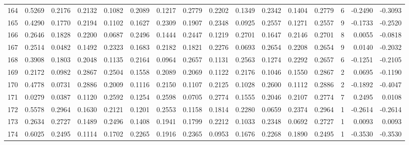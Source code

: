\begin{tabular}{lrrrrrrrrrrrrrrr}
164 &      0.5269 &  0.2176 &  0.2132 &  0.1082 &  0.2089 &  0.1217 &  0.2779 &  0.2202 &  0.1349 &  0.2342 &   0.1404 &     0.2779 &      6 &                   -0.2490 &                    -0.3093 \\
165 &      0.4290 &  0.1770 &  0.2194 &  0.1102 &  0.1627 &  0.2309 &  0.1907 &  0.2348 &  0.0925 &  0.2557 &   0.1271 &     0.2557 &      9 &                   -0.1733 &                    -0.2520 \\
166 &      0.2646 &  0.1828 &  0.2200 &  0.0687 &  0.2496 &  0.1444 &  0.2447 &  0.1219 &  0.2701 &  0.1647 &   0.2146 &     0.2701 &      8 &                    0.0055 &                    -0.0818 \\
167 &      0.2514 &  0.0482 &  0.1492 &  0.2323 &  0.1683 &  0.2182 &  0.1821 &  0.2276 &  0.0693 &  0.2654 &   0.2208 &     0.2654 &      9 &                    0.0140 &                    -0.2032 \\
168 &      0.3908 &  0.1803 &  0.2048 &  0.1135 &  0.2164 &  0.0964 &  0.2657 &  0.1131 &  0.2563 &  0.1274 &   0.2292 &     0.2657 &      6 &                   -0.1251 &                    -0.2105 \\
169 &      0.2172 &  0.0982 &  0.2867 &  0.2504 &  0.1558 &  0.2089 &  0.2069 &  0.1122 &  0.2176 &  0.1046 &   0.1550 &     0.2867 &      2 &                    0.0695 &                    -0.1190 \\
170 &      0.4778 &  0.0731 &  0.2886 &  0.2009 &  0.1116 &  0.2150 &  0.1107 &  0.2125 &  0.1028 &  0.2600 &   0.1112 &     0.2886 &      2 &                   -0.1892 &                    -0.4047 \\
171 &      0.0279 &  0.0387 &  0.1120 &  0.2592 &  0.1254 &  0.2598 &  0.0705 &  0.2774 &  0.1555 &  0.2046 &   0.2107 &     0.2774 &      7 &                    0.2495 &                     0.0108 \\
172 &      0.5578 &  0.2964 &  0.1630 &  0.2121 &  0.1201 &  0.2553 &  0.1158 &  0.1814 &  0.2280 &  0.0659 &   0.2374 &     0.2964 &      1 &                   -0.2614 &                    -0.2614 \\
173 &      0.2634 &  0.2727 &  0.1489 &  0.2496 &  0.1408 &  0.1941 &  0.1799 &  0.2212 &  0.1033 &  0.2348 &   0.0692 &     0.2727 &      1 &                    0.0093 &                     0.0093 \\
174 &      0.6025 &  0.2495 &  0.1114 &  0.1702 &  0.2265 &  0.1916 &  0.2365 &  0.0953 &  0.1676 &  0.2268 &   0.1890 &     0.2495 &      1 &                   -0.3530 &                    -0.3530 \\

\end{tabular}
